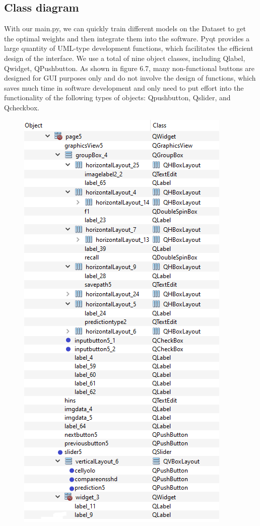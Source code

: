 \subsection{Class diagram} %
\label{sub:amet}
With our main.py, we can quickly train different models on the Dataset to get the optimal weights and then integrate them into the software. Pyqt provides a large quantity of UML-type development functions, which facilitates the efficient design of the interface. We use a total of nine object classes, including Qlabel, Qwidget, QPushbutton. As shown in figure 6.7, many non-functional buttons are designed for GUI purposes only and do not involve the design of functions, which saves much time in software development and only need to put effort into the functionality of the following types of objects: Qpushbutton, Qslider, and Qcheckbox.
\begin{figure}[t]
\begin{center}
\includegraphics[height=0.6\textheight]{thesis-template-master/images/tempsnip.png}

\end{center}
\end{figure}
